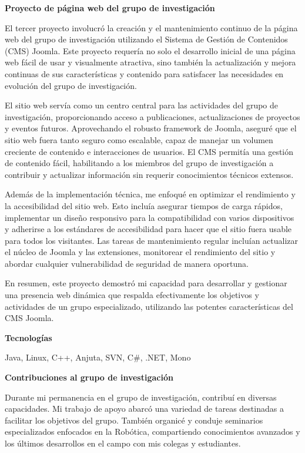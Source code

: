 \documentclass[a4paper,10pt]{article}
\newcommand{\cvsubsubsection}[1]{
\begin{tcolorbox}[colback=gray!10, colframe=gray!10, boxrule=0pt, arc=0mm, outer arc=0mm, width=\textwidth, boxsep=0pt, left=4mm, right=4mm, top=1mm, bottom=1mm]
  \textbf{#1}
\end{tcolorbox}
\vspace{1mm}
}
\newcommand{\cvsubsubsubsection}[1]{
  \begin{tcolorbox}[colback=gray!5, colframe=gray!5, boxrule=0pt, arc=0mm, outer arc=0mm, width=\textwidth, boxsep=0pt, left=6mm, right=6mm, top=1mm, bottom=1mm]
    \textbf{#1}
  \end{tcolorbox}
  \vspace{1mm}
}
\begin{document}
\cvsubsubsection{Proyecto de página web del grupo de investigación}
El tercer proyecto involucró la creación y el mantenimiento continuo de la página web del grupo de investigación utilizando el Sistema de Gestión de Contenidos (CMS) Joomla. Este proyecto requería no solo el desarrollo inicial de una página web fácil de usar y visualmente atractiva, sino también la actualización y mejora continuas de sus características y contenido para satisfacer las necesidades en evolución del grupo de investigación.

El sitio web servía como un centro central para las actividades del grupo de investigación, proporcionando acceso a publicaciones, actualizaciones de proyectos y eventos futuros. Aprovechando el robusto framework de Joomla, aseguré que el sitio web fuera tanto seguro como escalable, capaz de manejar un volumen creciente de contenido e interacciones de usuarios. El CMS permitía una gestión de contenido fácil, habilitando a los miembros del grupo de investigación a contribuir y actualizar información sin requerir conocimientos técnicos extensos.

Además de la implementación técnica, me enfoqué en optimizar el rendimiento y la accesibilidad del sitio web. Esto incluía asegurar tiempos de carga rápidos, implementar un diseño responsivo para la compatibilidad con varios dispositivos y adherirse a los estándares de accesibilidad para hacer que el sitio fuera usable para todos los visitantes. Las tareas de mantenimiento regular incluían actualizar el núcleo de Joomla y las extensiones, monitorear el rendimiento del sitio y abordar cualquier vulnerabilidad de seguridad de manera oportuna.

En resumen, este proyecto demostró mi capacidad para desarrollar y gestionar una presencia web dinámica que respalda efectivamente los objetivos y actividades de un grupo especializado, utilizando las potentes características del CMS Joomla.

\cvsubsubsubsection{Tecnologías}
Java, Linux, C++, Anjuta, SVN, C\#, .NET, Mono

\cvsubsubsection{Contribuciones al grupo de investigación}
Durante mi permanencia en el grupo de investigación, contribuí en diversas capacidades. Mi trabajo de apoyo abarcó una variedad de tareas destinadas a facilitar los objetivos del grupo. También organicé y conduje seminarios especializados enfocados en la Robótica, compartiendo conocimientos avanzados y los últimos desarrollos en el campo con mis colegas y estudiantes.
\end{document}
